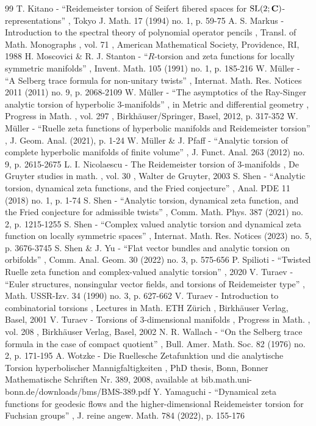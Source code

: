 \documentclass[10pt]{amsart}
\theoremstyle{plain}
\theoremstyle{definition}
\theoremstyle{remark}
\numberwithin{equation}{section}
\begin{document}
\begin{thebibliography}{99}
 T. Kitano - “Reidemeister torsion of Seifert fibered spaces for ${\rm SL}(2;{\bf C})$-representations” , Tokyo J. Math. 17 (1994) no. 1, p. 59-75
 A. S. Markus - Introduction to the spectral theory of polynomial operator pencils , Transl. of Math. Monographs , vol. 71 , American Mathematical Society, Providence, RI, 1988
 H. Moscovici \& R. J. Stanton - “$R$-torsion and zeta functions for locally symmetric manifolds” , Invent. Math. 105 (1991) no. 1, p. 185-216
 W. Müller - “A Selberg trace formula for non-unitary twists” , Internat. Math. Res. Notices 2011 (2011) no. 9, p. 2068-2109
 W. Müller - “The asymptotics of the Ray-Singer analytic torsion of hyperbolic 3-manifolds” , in Metric and differential geometry , Progress in Math. , vol. 297 , Birkhäuser/Springer, Basel, 2012, p. 317-352
 W. Müller - “Ruelle zeta functions of hyperbolic manifolds and Reidemeister torsion” , J. Geom. Anal. (2021), p. 1-24
 W. Müller \& J. Pfaff - “Analytic torsion of complete hyperbolic manifolds of finite volume” , J. Funct. Anal. 263 (2012) no. 9, p. 2615-2675
 L. I. Nicolaescu - The Reidemeister torsion of 3-manifolds , De Gruyter studies in math. , vol. 30 , Walter de Gruyter, 2003
 S. Shen - “Analytic torsion, dynamical zeta functions, and the Fried conjecture” , Anal. PDE 11 (2018) no. 1, p. 1-74
 S. Shen - “Analytic torsion, dynamical zeta function, and the Fried conjecture for admissible twists” , Comm. Math. Phys. 387 (2021) no. 2, p. 1215-1255
 S. Shen - “Complex valued analytic torsion and dynamical zeta function on locally symmetric spaces” , Internat. Math. Res. Notices (2023) no. 5, p. 3676-3745
 S. Shen \& J. Yu - “Flat vector bundles and analytic torsion on orbifolds” , Comm. Anal. Geom. 30 (2022) no. 3, p. 575-656
 P. Spilioti - “Twisted Ruelle zeta function and complex-valued analytic torsion” , 2020
 V. Turaev - “Euler structures, nonsingular vector fields, and torsions of Reidemeister type” , Math. USSR-Izv. 34 (1990) no. 3, p. 627-662
 V. Turaev - Introduction to combinatorial torsions , Lectures in Math. ETH Zürich , Birkhäuser Verlag, Basel, 2001
 V. Turaev - Torsions of $3$-dimensional manifolds , Progress in Math. , vol. 208 , Birkhäuser Verlag, Basel, 2002
 N. R. Wallach - “On the Selberg trace formula in the case of compact quotient” , Bull. Amer. Math. Soc. 82 (1976) no. 2, p. 171-195
 A. Wotzke - Die Ruellesche Zetafunktion und die analytische Torsion hyperbolischer Mannigfaltigkeiten , PhD thesis, Bonn, Bonner Mathematische Schriften Nr. 389, 2008, available at bib.math.uni-bonn.de/downloads/bms/BMS-389.pdf
 Y. Yamaguchi - “Dynamical zeta functions for geodesic flows and the higher-dimensional Reidemeister torsion for Fuchsian groups” , J. reine angew. Math. 784 (2022), p. 155-176
\end{thebibliography}
\end{document}
